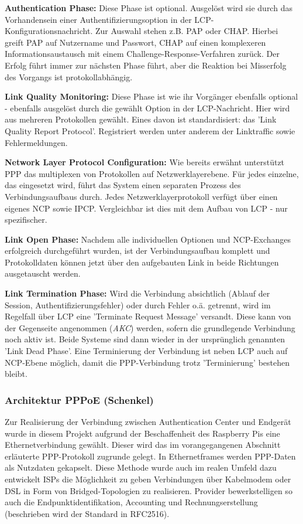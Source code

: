 \textbf{Authentication Phase:}
Diese Phase ist optional. Ausgelöst wird sie durch das Vorhandensein einer
Authentifizierungsoption in der LCP-Konfigurationsnachricht.
Zur Auswahl stehen z.B. \ac{PAP} oder \ac{CHAP}.
Hierbei greift PAP auf Nutzername und Passwort, CHAP auf einen komplexeren Informationsaustausch
mit einem Challenge-Response-Verfahren zurück. Der Erfolg führt immer zur nächsten
Phase führt, aber die Reaktion bei Misserfolg des Vorgangs ist protokollabhängig.

\textbf{Link Quality Monitoring:}
Diese Phase ist wie ihr Vorgänger ebenfalls optional - ebenfalls ausgelöst durch
die gewählt Option in der LCP-Nachricht.
Hier wird aus mehreren Protokollen gewählt. Eines davon ist standardisiert:
das 'Link Quality Report Protocol'. Registriert werden unter anderem der Linktraffic
sowie Fehlermeldungen.

\textbf{Network Layer Protocol Configuration:}
Wie bereits erwähnt unterstützt PPP  das multiplexen von Protokollen auf
Netzwerklayerebene. Für jedes einzelne, das eingesetzt wird,
führt das System einen separaten Prozess des Verbindungsaufbaus durch.
Jedes Netzwerklayerprotokoll verfügt über einen eigenes \ac{NCP} sowie \ac{IPCP}.
Vergleichbar ist dies mit dem Aufbau von \ac{LCP} - nur spezifischer.

\textbf{Link Open Phase:}
Nachdem alle individuellen Optionen und NCP-Exchanges erfolgreich durchgeführt wurden,
ist der Verbindungsaufbau komplett und Protokolldaten können jetzt über den aufgebauten
Link in beide Richtungen ausgetauscht werden.

\textbf{Link Termination Phase:}
Wird die Verbindung absichtlich (Ablauf der Session, Authentifizierungsfehler)
oder durch Fehler o.ä. getrennt, wird im Regelfall über \ac{LCP}
eine 'Terminate Request Message' versandt. Diese kann von der Gegenseite
angenommen (\textit{AKC}) werden, sofern die grundlegende Verbindung noch aktiv ist.
Beide Systeme sind dann wieder in der ursprünglich genannten 'Link Dead Phase'.
Eine Terminierung der Verbindung ist neben \ac{LCP} auch auf \ac{NCP}-Ebene möglich,
damit die PPP-Verbindung trotz 'Terminierung' bestehen bleibt.


\subsubsection{Architektur PPPoE (Schenkel)}
\label{subsubsection:architecture_pppoe}
Zur Realisierung der Verbindung zwischen Authentication Center und
Endgerät wurde in diesem Projekt aufgrund der Beschaffenheit des Raspberry Pis eine
Ethernetverbindung gewählt. Dieser wird das im vorangegangenen
Abschnitt erläuterte \ac{PPP}-Protokoll zugrunde gelegt.
In Ethernetframes werden PPP-Daten als Nutzdaten gekapselt.
Diese Methode wurde auch im realen Umfeld dazu entwickelt \acp{ISP} die
Möglichkeit zu geben Verbindungen über Kabelmodem oder DSL in Form
von Bridged-Topologien zu realisieren. Provider bewerkstelligen
so auch die Endpunktidentifikation, Accounting und Rechnungserstellung
(beschrieben wird der Standard in RFC2516).

